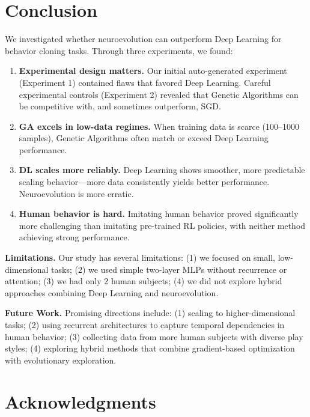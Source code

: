 \documentclass{article}
\begin{document}
\section{Conclusion}

We investigated whether neuroevolution can outperform Deep Learning for behavior cloning tasks. Through three experiments, we found:

\begin{enumerate}
    \item \textbf{Experimental design matters.} Our initial auto-generated experiment (Experiment 1) contained flaws that favored Deep Learning. Careful experimental controls (Experiment 2) revealed that Genetic Algorithms can be competitive with, and sometimes outperform, SGD.

    \item \textbf{GA excels in low-data regimes.} When training data is scarce (100--1000 samples), Genetic Algorithms often match or exceed Deep Learning performance.

    \item \textbf{DL scales more reliably.} Deep Learning shows smoother, more predictable scaling behavior---more data consistently yields better performance. Neuroevolution is more erratic.

    \item \textbf{Human behavior is hard.} Imitating human behavior proved significantly more challenging than imitating pre-trained RL policies, with neither method achieving strong performance.
\end{enumerate}

\textbf{Limitations.} Our study has several limitations: (1) we focused on small, low-dimensional tasks; (2) we used simple two-layer MLPs without recurrence or attention; (3) we had only 2 human subjects; (4) we did not explore hybrid approaches combining Deep Learning and neuroevolution.

\textbf{Future Work.} Promising directions include: (1) scaling to higher-dimensional tasks; (2) using recurrent architectures to capture temporal dependencies in human behavior; (3) collecting data from more human subjects with diverse play styles; (4) exploring hybrid methods that combine gradient-based optimization with evolutionary exploration.

\section*{Acknowledgments}
\end{document}

